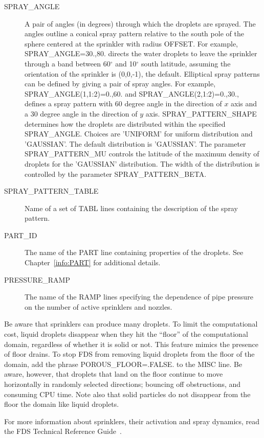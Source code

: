 \documentclass[11pt]{book}
\begin{document}
\begin{description}
\item[{\ct SPRAY\_ANGLE}] A pair of angles (in degrees) through which the droplets are sprayed. The angles outline a conical spray pattern relative to the south pole of the sphere centered at the sprinkler with radius {\ct OFFSET}. For example, {\ct SPRAY\_ANGLE=30.,80.} directs the water droplets to leave the sprinkler through a band between 60$^\circ$ and 10$^\circ$ south latitude, assuming the orientation of the sprinkler is (0,0,-1), the default. Elliptical spray patterns can be defined by giving a pair of spray angles. For example, {\ct SPRAY\_ANGLE(1,1:2)=0.,60.}  and {\ct SPRAY\_ANGLE(2,1:2)=0.,30.}, defines a spray pattern with 60 degree angle in the direction of $x$ axis and a 30 degree angle in the direction of $y$ axis. {\ct SPRAY\_PATTERN\_SHAPE} determines how the droplets are distributed within the specified {\ct SPRAY\_ANGLE}. Choices are {\ct 'UNIFORM'} for uniform distribution and {\ct 'GAUSSIAN'}. The default distribution is {\ct 'GAUSSIAN'}. The parameter {\ct SPRAY\_PATTERN\_MU} controls the latitude of the maximum density of droplets for the {\ct 'GAUSSIAN'} distribution. The width of the distribution is controlled by the parameter {\ct SPRAY\_PATTERN\_BETA}.
\item[{\ct SPRAY\_PATTERN\_TABLE}] Name of a set of {\ct TABL} lines containing the description of the spray pattern.
\item[{\ct PART\_ID}] The name of the {\ct PART} line containing properties of the droplets. See Chapter~\ref{info:PART} for additional details.
\item[{\ct PRESSURE\_RAMP}] The name of the {\ct RAMP} lines specifying the dependence of pipe pressure on the number of active sprinklers and nozzles.
\end{description}
Be aware that sprinklers can produce many droplets. To limit the computational cost, liquid droplets disappear when they hit the ``floor'' of the computational domain, regardless of whether it is solid or not. This feature mimics the presence of floor drains. To stop FDS from removing liquid droplets from the floor of the domain, add the phrase {\ct POROUS\_FLOOR=.FALSE.} to the {\ct MISC} line. Be aware, however, that droplets that land on the floor continue to move horizontally in randomly selected directions; bouncing off obstructions, and consuming CPU time. Note also that solid particles do not disappear from the floor the domain like liquid droplets.

For more information about sprinklers, their activation and spray dynamics, read the FDS Technical Reference Guide~\cite{FDS_Math_Guide}.
\end{document}
